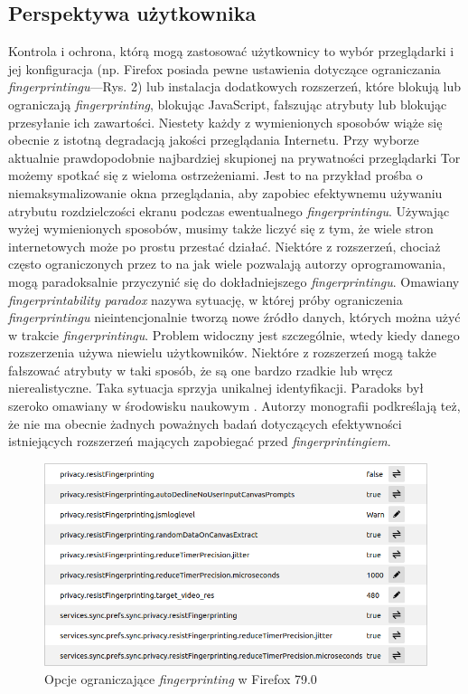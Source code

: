 \subsection{Perspektywa użytkownika}
Kontrola i ochrona, którą mogą zastosować użytkownicy to wybór przeglądarki i
jej konfiguracja (np. Firefox posiada pewne ustawienia dotyczące ograniczania
\emph{fingerprintingu}---Rys. 2) lub instalacja dodatkowych rozszerzeń, które
blokują lub ograniczają \emph{fingerprinting}, blokując JavaScript, fałszując
atrybuty lub blokując przesyłanie ich zawartości. Niestety każdy z wymienionych
sposobów wiąże się obecnie z istotną degradacją jakości przeglądania Internetu.
Przy wyborze aktualnie prawdopodobnie najbardziej skupionej na prywatności
przeglądarki Tor możemy spotkać się z wieloma ostrzeżeniami. Jest to na przykład
prośba o niemaksymalizowanie okna przeglądania, aby zapobiec efektywnemu
używaniu atrybutu rozdzielczości ekranu podczas ewentualnego
\emph{fingerprintingu}. Używając wyżej wymienionych sposobów, musimy także
liczyć się z tym, że wiele stron internetowych może po prostu przestać działać.
Niektóre z rozszerzeń, chociaż często ograniczonych przez to na jak wiele
pozwalają autorzy oprogramowania, mogą paradoksalnie przyczynić się do
dokładniejszego \emph{fingerprintingu}. Omawiany \emph{fingerprintability
	paradox} nazywa sytuację, w której próby ograniczenia \emph{fingerprintingu}
nieintencjonalnie tworzą nowe źródło danych, których można użyć w trakcie
\emph{fingerprintingu}. Problem widoczny jest szczególnie, wtedy kiedy danego
rozszerzenia używa niewielu użytkowników. Niektóre z rozszerzeń mogą także
fałszować atrybuty w taki sposób, że są one bardzo rzadkie lub wręcz
nierealistyczne. Taka sytuacja sprzyja unikalnej identyfikacji. Paradoks był
szeroko omawiany w środowisku naukowym \cite{eckersley2010unique,torres2015fp}.
Autorzy monografii podkreślają też, że nie ma obecnie żadnych poważnych badań
dotyczących efektywności istniejących rozszerzeń mających zapobiegać przed
\emph{fingerprintingiem}.

\begin{figure}
	\includegraphics[width=\textwidth,keepaspectratio]{img/02}
	\caption{Opcje ograniczające \emph{fingerprinting} w Firefox 79.0}
\end{figure}

